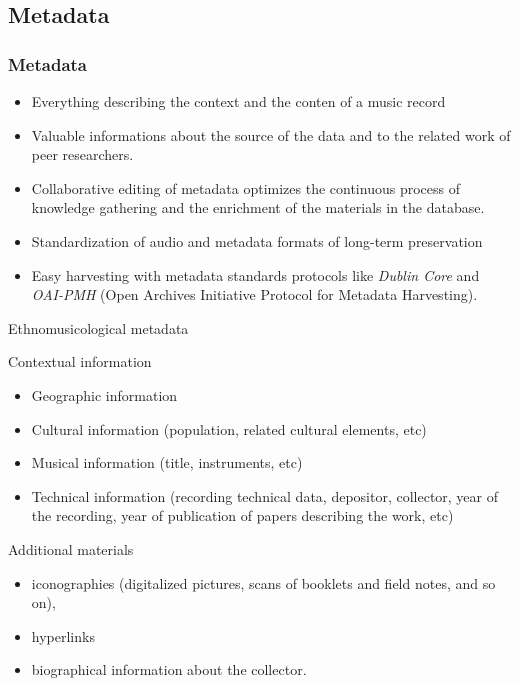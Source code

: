 \documentclass[final, hyperref, table]{beamer}
\begin{document}
\subsection{Metadata}\label{sec:metadata}
\begin{frame}\frametitle{Metadata}
  \begin{block}{}
    \begin{itemize}
    \item \alert{Everything} describing the context and the conten of a music record
    \item Valuable informations about the \alert{source of the data} and to the related \alert{work of
        peer researchers}.
    \item \alert{Collaborative editing} of metadata optimizes the continuous process of knowledge gathering
      and the \alert{enrichment} of the materials in the database.
    \item \alert{Standardization} of audio and metadata formats of long-term preservation
    \item \alert{Easy harvesting} with metadata standards protocols like
      \emph{Dublin Core} and \emph{OAI-PMH} (Open Archives Initiative
      Protocol for Metadata Harvesting).
    \end{itemize}
  \end{block}
\end{frame}


\begin{frame}[label=telemeta_metadata]{Ethnomusicological metadata}
\begin{block}{Contextual information}
  \begin{itemize}
  \item Geographic information
  \item Cultural information (population, related cultural elements, etc)
  \item Musical information (title, instruments, etc)
  \item Technical information (recording technical data, depositor, collector, year of the recording, year of publication of papers describing the work, etc)
  \end{itemize}
\end{block}

\begin{block}{Additional materials}
  \begin{itemize}
  \item iconographies (digitalized pictures, scans of booklets and
    field notes, and so on),
  \item hyperlinks
  \item biographical information about the collector.
  \end{itemize}
\end{block}

\end{frame}
\end{document}
